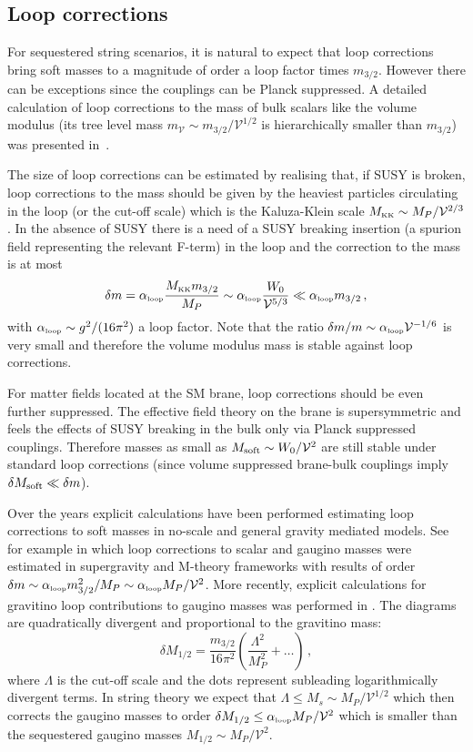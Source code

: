 \documentclass[11pt,a4paper]{article}
\newcommand{\be}{\begin{equation}}
\newcommand{\ee}{\end{equation}}
\def\KK{{\scriptscriptstyle \rm KK}}
\def\lp{{\scriptscriptstyle \rm loop}}
\newcommand\vo{{\mathcal{V}}}
\begin{document}
\subsection{Loop corrections}

For sequestered string scenarios, it is natural to expect that loop corrections bring soft masses to a magnitude of order a loop factor times $m_{3/2}$. However there can be exceptions since the couplings can be Planck suppressed. A detailed calculation of loop corrections to the mass of bulk scalars like the volume modulus (its tree level mass $m_\vo \sim m_{3/2}/\vo^{1/2}$ is hierarchically smaller than $m_{3/2}$) was presented in~\cite{Burgess:2010sy}.

The size of loop corrections can be estimated by realising that, if SUSY is broken,
loop corrections to the mass should be given by the heaviest particles circulating in the loop
(or the cut-off scale) which is the Kaluza-Klein scale $M_\KK\sim M_P/\vo^{2/3}$.
In the absence of SUSY there is a need of a SUSY breaking insertion (a spurion field representing the relevant F-term)
in the loop and the correction to the mass is at most
\be
\delta m=\alpha_\lp \frac{M_\KK m_{3/2}}{M_P}\sim \alpha_\lp\frac{W_0}{\vo^{5/3}}\ll \alpha_\lp m_{3/2}\,,
\ee
with $\alpha_\lp\sim g^2/(16\pi^2)$ a loop factor. Note that the ratio $\delta m/m\sim \alpha_\lp \vo^{-1/6}$ is very small
and therefore the volume modulus mass is stable against loop corrections.

For matter fields located at the SM brane, loop corrections should be even further suppressed.
The effective field theory on the brane is supersymmetric and feels the effects of SUSY breaking in the bulk only via Planck suppressed couplings.
Therefore masses as small as $M_{\rm soft}\sim W_0/\vo^2$ are still stable under standard loop corrections
(since volume suppressed brane-bulk couplings imply $\delta M_{\rm soft}\ll \delta m$).

Over the years explicit calculations have been performed estimating loop corrections to soft masses in no-scale
and general gravity mediated models. See for example \cite{Ellis:1986nr,Antoniadis:1997ic}
in which loop corrections to scalar and gaugino masses were estimated in supergravity and M-theory frameworks with results of order
$\delta m \sim \alpha_\lp m_{3/2}^2/M_P\sim \alpha_\lp M_P/\vo^2$. More recently, explicit calculations for gravitino loop contributions to gaugino masses was performed in \cite{Lee:2013aia}. The diagrams are quadratically divergent and proportional to the gravitino mass:
\be
\delta M_{1/2} = \frac{m_{3/2}}{16\pi^2}\left(\frac{\Lambda^2}{M_P^2}+\dots\right)\,,
\ee
where $\Lambda$ is the cut-off scale and the dots represent subleading logarithmically divergent terms.
In string theory we expect that $\Lambda\leq M_s\sim M_P/\vo^{1/2}$ which then corrects the gaugino masses to order
$\delta M_{1/2}\leq \alpha_\lp M_P/\vo^2$ which is smaller than the sequestered gaugino masses $M_{1/2}\sim M_P/\vo^2$.
\end{document}
